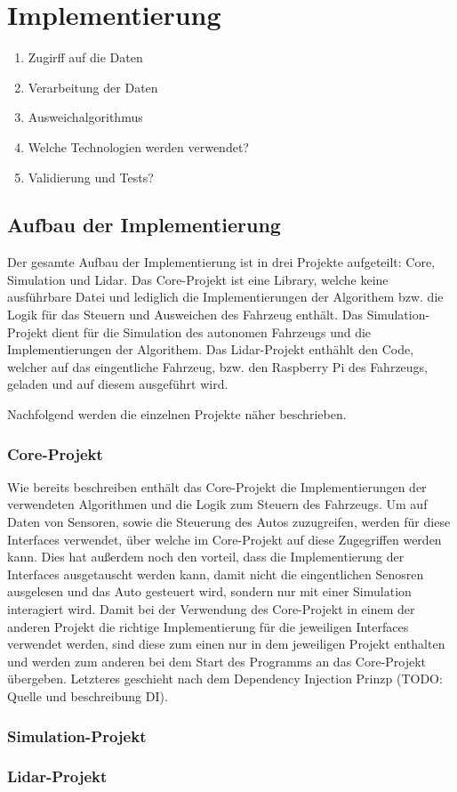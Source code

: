 \section{Implementierung}

\begin{enumerate}
    \item Zugirff auf die Daten
    \item Verarbeitung der Daten
    \item Ausweichalgorithmus
    \item Welche Technologien werden verwendet?
    \item Validierung und Tests?
\end{enumerate}

\subsection{Aufbau der Implementierung}

Der gesamte Aufbau der Implementierung ist in drei Projekte aufgeteilt: Core, Simulation und Lidar. 
Das Core-Projekt ist eine Library, welche keine ausführbare Datei und lediglich die Implementierungen der Algorithem bzw. die Logik für das Steuern und Ausweichen des Fahrzeug enthält. 
Das Simulation-Projekt dient für die Simulation des autonomen Fahrzeugs und die Implementierungen der Algorithem. 
Das Lidar-Projekt enthählt den Code, welcher auf das eingentliche Fahrzeug, bzw. den Raspberry Pi des Fahrzeugs, geladen und auf diesem ausgeführt wird. 

Nachfolgend werden die einzelnen Projekte näher beschrieben. 

\subsubsection{Core-Projekt}

Wie bereits beschreiben enthält das Core-Projekt die Implementierungen der verwendeten Algorithmen und die Logik zum Steuern des Fahrzeugs. 
Um auf Daten von Sensoren, sowie die Steuerung des Autos zuzugreifen, werden für diese Interfaces verwendet, über welche im Core-Projekt auf diese Zugegriffen werden kann. 
Dies hat außerdem noch den vorteil, dass die Implementierung der Interfaces ausgetauscht werden kann, 
damit nicht die eingentlichen Senosren ausgelesen und das Auto gesteuert wird, sondern nur mit einer Simulation interagiert wird. 
Damit bei der Verwendung des Core-Projekt in einem der anderen Projekt die richtige Implementierung für die jeweiligen Interfaces verwendet werden, 
sind diese zum einen nur in dem jeweiligen Projekt enthalten und werden zum anderen bei dem Start des Programms an das Core-Projekt übergeben. 
Letzteres geschieht nach dem Dependency Injection Prinzp (TODO: Quelle und beschreibung DI).

\subsubsection{Simulation-Projekt}

\subsubsection{Lidar-Projekt}

\newpage
